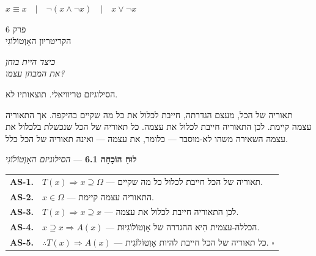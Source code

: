 \documentclass[10pt, openany, oneside]{book}
\renewcommand{\footnotesize}{\fontsize{8.5}{11}\selectfont}
\renewcommand{\large}{\fontsize{11.5}{14}\selectfont}
\renewcommand{\huge}{\fontsize{17}{21}\selectfont}
\begin{document}
\begin{center}
    $x \equiv x \quad | \quad \neg(x \wedge \neg x) \quad | \quad x \vee \neg x$
\end{center}

%
%
%

\newpage

\begin{center}
    {\huge\textsc{פרק 6}}\\[0.3em]
    {\large\textsc{הקריטריון האָוְטוֹלוֹגִי}}
\end{center}

\vspace{1.5em}

\begin{center}
    \textit{%
    כיצד היית בוחן\\
    את המבחן עצמו?}
\end{center}

\vspace{2em}


\noindent הסילוגיזם טריוויאלי. תוצאותיו לא.

תאוריה של הכל, מעצם הגדרתה, חייבת לכלול את כל מה שקיים בהיקפה. אך התאוריה עצמה קיימת. לכן התאוריה חייבת לכלול את עצמה. כל תאוריה של הכל שנכשלת בלכלול את עצמה השאירה משהו לא-מוסבר — כלומר, את עצמה — ואינה תאוריה של הכל כלל.

\vspace{0.5em}

\textbf{לוּחַ הוֹכָחָה 6.1} --- \textit{הסילוגיזם האָוְטוֹלוֹגִי}

\vspace{0.5em}

{\footnotesize
\noindent\begin{tabular}{r p{}}
\textbf{AS-1.} & $T(x) \Rightarrow x \supseteq \Omega$ — תאוריה של הכל חייבת לכלול כל מה שקיים. \\[0.3em]
\textbf{AS-2.} & $x \in \Omega$ — התאוריה עצמה קיימת. \\[0.3em]
\textbf{AS-3.} & $T(x) \Rightarrow x \supseteq x$ — לכן התאוריה חייבת לכלול את עצמה. \\[0.3em]
\textbf{AS-4.} & $x \supseteq x \Rightarrow A(x)$ — הכללה-עצמית הִיא ההגדרה של אָוְטוֹלוֹגִיוּת. \\[0.3em]
\textbf{AS-5.} & $\therefore T(x) \Rightarrow A(x)$ — כל תאוריה של הכל חייבת להיות אָוְטוֹלוֹגִית. $\square$ \\[0.3em]
\end{tabular}
}
\end{document}
